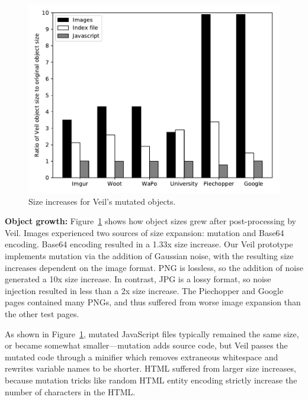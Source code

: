 \begin{figure}
	\centering
	\includegraphics[width=\textwidth]{veil-figs/size_graph.pdf}
	\caption{Size increases for Veil's mutated objects.}
	\label{fig:mutateSize}
\end{figure}

\noindent
\textbf{Object growth:}
Figure~\ref{fig:mutateSize} shows how object sizes grew
after post-processing by Veil. Images experienced
two sources of size expansion: mutation and Base64
encoding. Base64 encoding resulted in a 1.33x size
increase. Our Veil prototype implements mutation via
the addition of Gaussian noise, with the resulting
size increases dependent on the image format. PNG
is lossless, so the addition of noise generated
a 10x size increase. In contrast, JPG is a lossy
format, so noise injection resulted in less than
a 2x size increase. The Piechopper and Google pages
contained many PNGs, and thus suffered from worse
image expansion than the other test pages.

As shown in Figure~\ref{fig:mutateSize}, mutated
JavaScript files typically remained the same size,
or became somewhat smaller---mutation adds source
code, but Veil passes the mutated code through
a minifier which removes extraneous whitespace
and rewrites variable names to be shorter. HTML
suffered from larger size increases, because
mutation tricks like random HTML entity encoding
strictly increase the number of characters in the
HTML. \\

